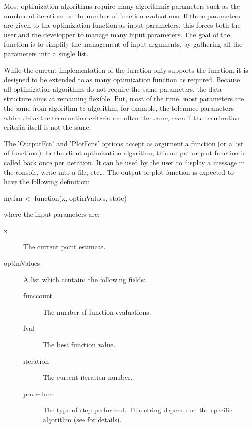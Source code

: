 %
\begin{Details}\relax
Most optimization algorithms require many algorithmic parameters such as the
number of iterations or the number of function evaluations. If these
parameters are given to the optimization function as input parameters, this
forces both the user and the developper to manage many input parameters. The
goal of the  function is to simplify the management of input
arguments, by gathering all the parameters into a single list.

While the current implementation of the  function only supports
the  function, it is designed to be extended to as many
optimization function as required. Because all optimization algorithms do not
require the same parameters, the data structure aims at remaining flexible.
But, most of the time, most parameters are the same from algorithm to
algorithm, for example, the tolerance parameters which drive the termination
criteria are often the same, even if the termination criteria itself is not
the same.

The 'OutputFcn' and 'PlotFcns' options accept as argument a function (or a
list of functions). In the client optimization algorithm, this output or plot
function is called back once per iteration. It can be used by the user to
display a message in the console, write into a file, etc...
The output or plot function is expected to have the following definition:

myfun <- function(x, optimValues, state)

where the input parameters are:\begin{description}

\item[x] The current point estimate.
\item[optimValues] A list which contains the following fields:\begin{description}

\item[funccount] The number of function evaluations.
\item[fval] The best function value.
\item[iteration] The current iteration number.
\item[procedure] The type of step performed. This string depends on the
specific algorithm (see  for details).

\end{description}



\end{description}
\end{Details}
